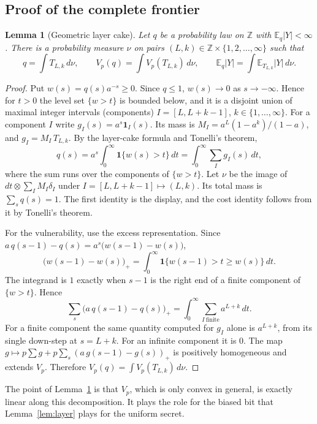 \documentclass{article}
\newtheorem{lemma}[theorem]{Lemma}
\theoremstyle{definition}
\theoremstyle{remark}
\newcommand{\Z}{\mathbb{Z}}
\newcommand{\E}{\mathbb{E}}
\begin{document}
\subsection{Proof of the complete frontier}
\begin{lemma}[Geometric layer cake]\label{lem:geolayer}
Let \(q\) be a probability law on \(\Z\) with \(\E_q|Y|<\infty\). There is a probability measure \(\nu\) on pairs \((L,k)\in\Z\times\{1,2,\dots,\infty\}\) such that
\[
q=\int T_{L,k}\,d\nu,\qquad V_p(q)=\int V_p(T_{L,k})\,d\nu,\qquad \E_q|Y|=\int \E_{T_{L,k}}|Y|\,d\nu .
\]
\end{lemma}
\begin{proof}
Put \(w(s)=q(s)a^{-s}\ge0\). Since \(q\le1\), \(w(s)\to0\) as \(s\to-\infty\). Hence for \(t>0\) the level set \(\{w>t\}\) is bounded below, and it is a disjoint union of maximal integer intervals (components) \(I=[L,L+k-1]\), \(k\in\{1,\dots,\infty\}\). For a component \(I\) write \(g_I(s)=a^s\mathbf 1_I(s)\). Its mass is \(M_I=a^L(1-a^k)/(1-a)\), and \(g_I=M_I\,T_{L,k}\). By the layer-cake formula and Tonelli's theorem,
\[
q(s)=a^s\int_0^\infty\mathbf 1\{w(s)>t\}\,dt=\int_0^\infty\sum_{I}g_I(s)\,dt ,
\]
where the sum runs over the components of \(\{w>t\}\). Let \(\nu\) be the image of \(dt\otimes\sum_I M_I\delta_I\) under \(I=[L,L+k-1]\mapsto(L,k)\). Its total mass is \(\sum_s q(s)=1\). The first identity is the display, and the cost identity follows from it by Tonelli's theorem.

For the vulnerability, use the excess representation. Since \(a\,q(s-1)-q(s)=a^s\bigl(w(s-1)-w(s)\bigr)\),
\[
\bigl(w(s-1)-w(s)\bigr)_+=\int_0^\infty\mathbf 1\{w(s-1)>t\ge w(s)\}\,dt .
\]
The integrand is \(1\) exactly when \(s-1\) is the right end of a finite component of \(\{w>t\}\). Hence
\[
\sum_s\bigl(a\,q(s-1)-q(s)\bigr)_+=\int_0^\infty\sum_{I\ \text{finite}}a^{L+k}\,dt .
\]
For a finite component the same quantity computed for \(g_I\) alone is \(a^{L+k}\), from its single down-step at \(s=L+k\). For an infinite component it is \(0\). The map \(g\mapsto p\sum g+p\sum_s(a\,g(s-1)-g(s))_+\) is positively homogeneous and extends \(V_p\). Therefore \(V_p(q)=\int V_p(T_{L,k})\,d\nu\).
\end{proof}

The point of Lemma~\ref{lem:geolayer} is that \(V_p\), which is only convex in general, is exactly linear along this decomposition. It plays the role for the biased bit that Lemma~\ref{lem:layer} plays for the uniform secret.
\end{document}
